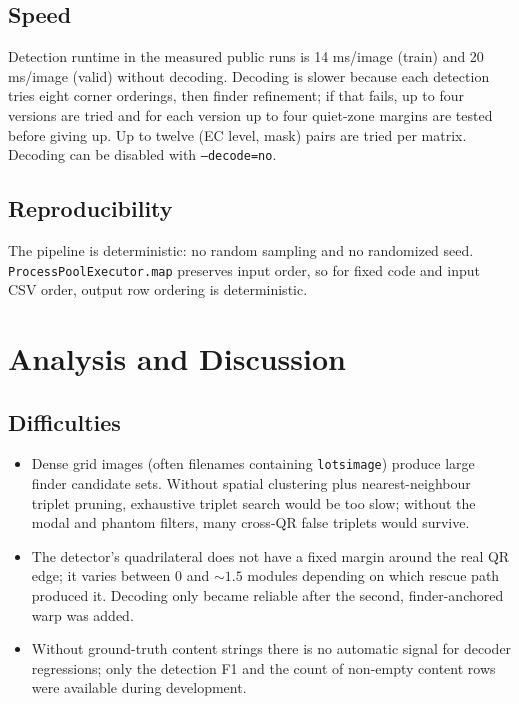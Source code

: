 \documentclass[11pt,a4paper]{article}
\begin{document}
\subsection{Speed}

Detection runtime in the measured public runs is 14 ms/image (train) and 20 ms/image (valid) without decoding.
Decoding is slower because each detection tries eight corner orderings,
then finder refinement; if that fails, up to four versions are tried and
for each version up to four quiet-zone margins are tested before giving
up. Up to twelve (EC level, mask) pairs are tried per matrix.
Decoding can be disabled with \texttt{---decode=no}.

\subsection{Reproducibility}

The pipeline is deterministic: no random sampling and no randomized seed.
\texttt{ProcessPoolExecutor.map} preserves input order, so for fixed code
and input CSV order, output row ordering is deterministic.

\section{Analysis and Discussion}

\subsection{Difficulties}

\begin{itemize}[leftmargin=1.4em, itemsep=0.2em]
  \item Dense grid images (often filenames containing \texttt{lotsimage})
        produce large finder candidate sets. Without spatial clustering
        plus nearest-neighbour triplet pruning, exhaustive triplet search
        would be too slow; without the modal and phantom filters, many
        cross-QR false triplets would survive.
  \item The detector's quadrilateral does not have a fixed margin
        around the real QR edge; it varies between $0$ and
        $\sim 1.5$ modules depending on which rescue path produced it.
        Decoding only became reliable after the second, finder-anchored
        warp was added.
  \item Without ground-truth content strings there is no automatic
        signal for decoder regressions; only the detection F1 and the
        count of non-empty content rows were available during
        development.
\end{itemize}
\end{document}
